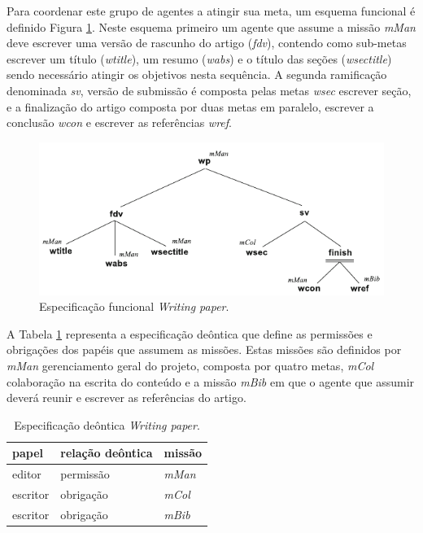Para coordenar este grupo de agentes a atingir sua meta, um esquema funcional é definido Figura \ref{fig:writing-paper-funcional}. Neste esquema primeiro um agente que assume a missão \textit{mMan} deve escrever uma versão de rascunho do artigo (\textit{fdv}), contendo como sub-metas escrever um título (\textit{wtitle}), um resumo (\textit{wabs}) e o título das seções (\textit{wsectitle}) sendo necessário atingir os objetivos nesta sequência. A segunda ramificação denominada \textit{sv}, versão de submissão é composta pelas metas \textit{wsec} escrever seção, e a finalização do artigo composta por duas metas em paralelo, escrever a conclusão \textit{wcon} e escrever as referências \textit{wref}.
    
\begin{figure}[ht]
\centering
\includegraphics[scale=1.3]{imagens/5-writing-paper-funcional.pdf}
\caption{Especificação funcional \textit{Writing paper}. \cite{hubner2011normative}}
\label{fig:writing-paper-funcional}
\end{figure}

A Tabela \ref{tab:writing-paper-deontica} representa a especificação deôntica que define as permissões e obrigações dos papéis que assumem as missões. Estas missões são definidos por \textit{mMan} gerenciamento geral do projeto, composta por quatro metas, \textit{mCol} colaboração na escrita do conteúdo  e a missão \textit{mBib} em que o agente que assumir deverá reunir e escrever as referências do artigo.

\begin{table}[ht]
\centering
\caption{Especificação deôntica \textit{Writing paper}. \cite{hubner2011normative}}
\label{tab:writing-paper-deontica}
\begin{tabular}{@{}lll@{}}
\toprule
papel       & relação deôntica  & missão                        \\ \midrule
editor      & permissão         & \textit{mMan}                          \\
escritor    & obrigação         & \textit{mCol}                          \\
escritor    & obrigação         & \textit{mBib}                          \\
\bottomrule
\end{tabular}
\end{table}

